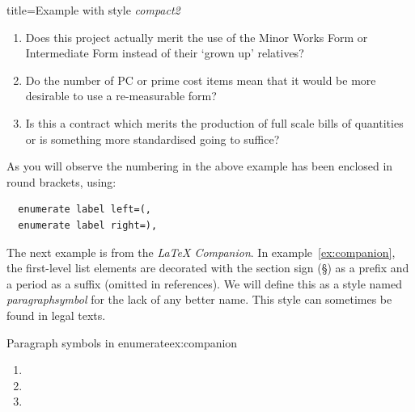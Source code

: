 \begin{tcblisting}{title=Example with style \textit{compact2}}
\begin{enumerate}
\item Does this project actually merit the use of the Minor Works Form or Intermediate Form instead of their `grown up' relatives?
\item Do the number of PC or prime cost items mean that it would be more desirable to use a re-measurable form?
\item Is this a contract which merits the production of full scale bills
of quantities or is something more standardised going to suffice?
\end{enumerate}
\end{tcblisting}

As you will observe the numbering in the above example has been enclosed in round brackets, using:

\begin{tcolorbox}
\begin{lstlisting}
  enumerate label left=(,
  enumerate label right=),
\end{lstlisting}
\end{tcolorbox}

The next example is from the \textit{LaTeX Companion}. In example~\ref{ex:companion}, the first-level list elements are decorated with the section sign (\S) as a prefix and a period as a suffix (omitted in references). We will
define this as a style named \textit{paragraphsymbol} for the lack of any better name. This style can sometimes be found in legal texts.

\begin{texexample}{Paragraph symbols in enumerate}{ex:companion}
\begin{enumerate}
\item \lorem
\item \lorem
\item \lorem
\end{enumerate}
\end{texexample}

